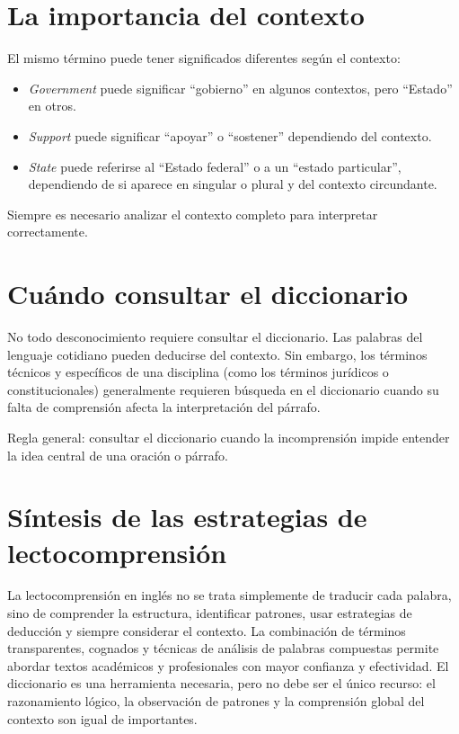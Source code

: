 \documentclass[12pt,oneside]{book}
\begin{document}
\section{La importancia del contexto}

El mismo término puede tener significados diferentes según el contexto:

\begin{itemize}
    \item \textit{Government} puede significar ``gobierno'' en algunos contextos, pero ``Estado'' en otros.
    \item \textit{Support} puede significar ``apoyar'' o ``sostener'' dependiendo del contexto.
    \item \textit{State} puede referirse al ``Estado federal'' o a un ``estado particular'', dependiendo de si aparece en singular o plural y del contexto circundante.
\end{itemize}

Siempre es necesario analizar el contexto completo para interpretar correctamente.

\section{Cuándo consultar el diccionario}

No todo desconocimiento requiere consultar el diccionario. Las palabras del lenguaje cotidiano pueden deducirse del contexto. Sin embargo, los términos técnicos y específicos de una disciplina (como los términos jurídicos o constitucionales) generalmente requieren búsqueda en el diccionario cuando su falta de comprensión afecta la interpretación del párrafo.

\begin{important}
Regla general: consultar el diccionario cuando la incomprensión impide entender la idea central de una oración o párrafo.
\end{important}

\section{Síntesis de las estrategias de lectocomprensión}

La lectocomprensión en inglés no se trata simplemente de traducir cada palabra, sino de comprender la estructura, identificar patrones, usar estrategias de deducción y siempre considerar el contexto. La combinación de términos transparentes, cognados y técnicas de análisis de palabras compuestas permite abordar textos académicos y profesionales con mayor confianza y efectividad. El diccionario es una herramienta necesaria, pero no debe ser el único recurso: el razonamiento lógico, la observación de patrones y la comprensión global del contexto son igual de importantes.
\end{document}
